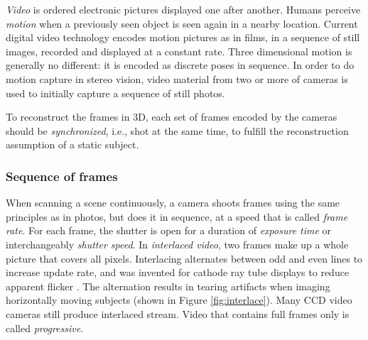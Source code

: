 

\emph{Video} is ordered electronic pictures displayed one after another.
Humans perceive \emph{motion} when a previously seen object is seen again in a nearby location.
Current digital video technology encodes motion pictures as in films, in a sequence of still images, recorded and displayed at a constant rate.
Three dimensional motion is generally no different: it is encoded as discrete poses in sequence.
In order to do motion capture in stereo vision, video material from two or more of cameras is used to initially capture a sequence of still photos.

To reconstruct the frames in 3D, each set of frames encoded by the cameras should be \emph{synchronized}, i.e., shot at the same time, to fulfill the reconstruction assumption of a static subject.


\subsubsection{Sequence of frames} %

When scanning a scene continuously, a camera shoots frames using the same principles as in photos, but does it in sequence, at a speed that is called \emph{frame rate}.
For each frame, the shutter is open for a duration of \emph{exposure time} or interchangeably \emph{shutter speed}.
In \emph{interlaced video}, two frames make up a whole picture that covers all pixels.
Interlacing alternates between odd and even lines to increase update rate, and was invented for cathode ray tube displays to reduce apparent flicker \cite{poynton1996technical}.
The alternation results in tearing artifacts when imaging horizontally moving subjects (shown in Figure \ref{fig:interlace}).
Many CCD video cameras still produce interlaced stream. %
Video that contains full frames only is called \emph{progressive}.


